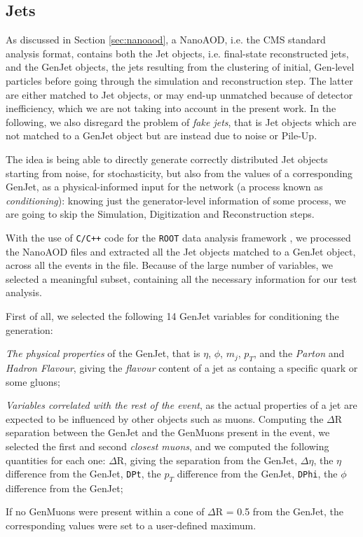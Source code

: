 \subsection{Jets}

As discussed in Section \ref{sec:nanoaod}, a NanoAOD, i.e. the CMS standard analysis format, contains both the Jet objects, i.e. final-state reconstructed jets, and the GenJet objects, the jets resulting from the clustering of initial, Gen-level particles before going through the simulation and reconstruction step. The latter are either matched to Jet objects, or may end-up unmatched because of detector inefficiency, which we are not taking into account in the present work. In the following, we also disregard the problem of \emph{fake jets}, that is Jet objects which are not matched to a GenJet object but are instead due to noise or Pile-Up.

The idea is being able to directly generate correctly distributed Jet objects starting from noise, for stochasticity,  but also from the values of a corresponding GenJet, as a physical-informed input for the network (a process known as \emph{conditioning}): knowing just the generator-level information of some process, we are going to skip the Simulation, Digitization and Reconstruction steps.


With the use of \texttt{C/C++} code for the \texttt{ROOT} data analysis framework \cite{Brun:491486}, we processed the NanoAOD files and extracted all the Jet objects matched to a GenJet object, across all the events in the file. Because of the large number of variables, we selected a meaningful subset, containing all the necessary information for our test analysis.

First of all, we selected the following 14 GenJet variables for conditioning the generation: 

\begin{outline}
\1 \emph{The physical properties} of the GenJet, that is $\eta$, $\phi$, $m_j$, $p_T$, and the \emph{Parton} and \emph{Hadron Flavour}, giving the \emph{flavour} content of a jet as containg a specific quark or some gluons;

\1 \emph{Variables correlated with the rest of the event}, as the actual properties of a jet are expected to be influenced by other objects such as muons. Computing the $\Delta$R separation between the GenJet and the GenMuons present in the event, we selected the first and second \emph{closest muons}, and we computed the following quantities for each one:
\2 $\Delta$R, giving the separation from the GenJet, $\Delta \eta$, the $\eta$ difference from the GenJet, \texttt{DPt}, the $p_T$ difference from the GenJet, \texttt{DPhi}, the $\phi$ difference from the GenJet;

\1 If no GenMuons were present within a cone of $\Delta$R = 0.5 from the GenJet, the corresponding values were set to a user-defined maximum.

\end{outline}

